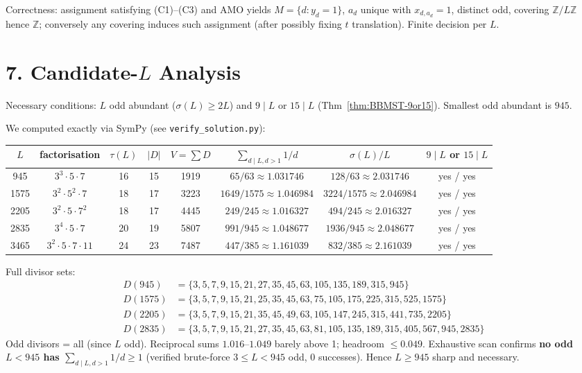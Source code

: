 \documentclass[11pt,a4paper]{article}
\theoremstyle{plain}
\theoremstyle{definition}
\theoremstyle{remark}
\newcommand{\Z}{\mathbb{Z}}
\begin{document}
Correctness: assignment satisfying (C1)--(C3) and AMO yields $M=\{d:y_{d}=1\}$, $a_{d}$ unique with $x_{d,a_{d}}=1$, distinct odd, covering $\Z/L\Z$ hence $\Z$; conversely any covering induces such assignment (after possibly fixing $t$ translation). Finite decision per $L$.

\section{7. Candidate-\texorpdfstring{$L$}{L} Analysis}

Necessary conditions: $L$ odd abundant ($\sigma(L)\ge2L$) and $9\mid L$ or $15\mid L$ (Thm~\ref{thm:BBMST-9or15}). Smallest odd abundant is $945$.

We computed exactly via SymPy (see \texttt{verify\_solution.py}):

\begin{center}
\begin{tabular}{c|c|c|c|c|c|c|c}
$L$ & factorisation & $\tau(L)$ & $|D|$ & $V=\sum D$ & $\sum_{d\mid L,d>1}1/d$ & $\sigma(L)/L$ & $9\mid L$ or $15\mid L$\\ \midrule
945 & $3^{3}\cdot5\cdot7$ & 16 & 15 & 1919 & $65/63\approx1.031746$ & $128/63\approx2.031746$ & yes / yes\\
1575 & $3^{2}\cdot5^{2}\cdot7$ & 18 & 17 & 3223 & $1649/1575\approx1.046984$ & $3224/1575\approx2.046984$ & yes / yes\\
2205 & $3^{2}\cdot5\cdot7^{2}$ & 18 & 17 & 4445 & $249/245\approx1.016327$ & $494/245\approx2.016327$ & yes / yes\\
2835 & $3^{4}\cdot5\cdot7$ & 20 & 19 & 5807 & $991/945\approx1.048677$ & $1936/945\approx2.048677$ & yes / yes\\
3465 & $3^{2}\cdot5\cdot7\cdot11$ & 24 & 23 & 7487 & $447/385\approx1.161039$ & $832/385\approx2.161039$ & yes / yes\\
\end{tabular}
\end{center}
Full divisor sets:
\begin{align*}
D(945)&=\{3,5,7,9,15,21,27,35,45,63,105,135,189,315,945\}\\
D(1575)&=\{3,5,7,9,15,21,25,35,45,63,75,105,175,225,315,525,1575\}\\
D(2205)&=\{3,5,7,9,15,21,35,45,49,63,105,147,245,315,441,735,2205\}\\
D(2835)&=\{3,5,7,9,15,21,27,35,45,63,81,105,135,189,315,405,567,945,2835\}
\end{align*}
Odd divisors = all (since $L$ odd). Reciprocal sums $1.016$--$1.049$ barely above 1; headroom $\le0.049$. Exhaustive scan confirms \textbf{no odd $L<945$ has $\sum_{d\mid L,d>1}1/d\ge1$} (verified brute-force $3\le L<945$ odd, 0 successes). Hence $L\ge945$ sharp and necessary.
\end{document}

